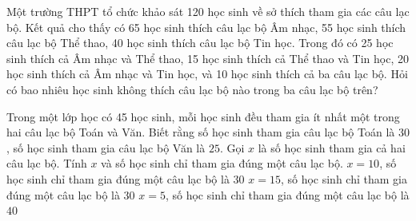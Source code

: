 
\begin{ex}%
Một trường THPT tổ chức khảo sát 120 học sinh về sở thích tham gia các câu lạc bộ. Kết quả cho thấy có 65 học sinh thích câu lạc bộ Âm nhạc, 55 học sinh thích câu lạc bộ Thể thao, 40 học sinh thích câu lạc bộ Tin học. Trong đó có 25 học sinh thích cả Âm nhạc và Thể thao, 15 học sinh thích cả Thể thao và Tin học, 20 học sinh thích cả Âm nhạc và Tin học, và 10 học sinh thích cả ba câu lạc bộ. Hỏi có bao nhiêu học sinh không thích câu lạc bộ nào trong ba câu lạc bộ trên?
\end{ex}

\begin{ex}%
Trong một lớp học có 45 học sinh, mỗi học sinh đều tham gia ít nhất một trong hai câu lạc bộ Toán và Văn. Biết rằng số học sinh tham gia câu lạc bộ Toán là $30$, số học sinh tham gia câu lạc bộ Văn là $25$. Gọi $x$ là số học sinh tham gia cả hai câu lạc bộ. Tính $x$ và số học sinh chỉ tham gia đúng một câu lạc bộ.
{$x=10$, số học sinh chỉ tham gia đúng một câu lạc bộ là $30$}
{$x=15$, số học sinh chỉ tham gia đúng một câu lạc bộ là $30$}
{$x=5$, số học sinh chỉ tham gia đúng một câu lạc bộ là $40$}
\end{ex}
